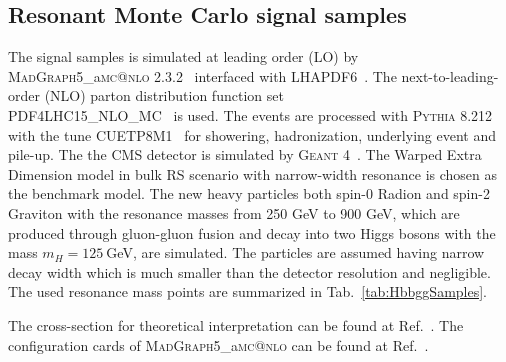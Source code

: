 \subsection{Resonant Monte Carlo signal samples} \label{sec:ResonantMCsamples}

The signal samples is simulated at leading order (LO) by \\{\textsc{MadGraph5}\_a\textsc{mc@nlo}\xspace} 2.3.2~\cite{1405.0301,1407.0281} interfaced with LHAPDF6~\cite{1412.7420}.
The next-to-leading-order (NLO) parton distribution function set \\PDF4LHC15\_NLO\_MC~\cite{1504.06469,1510.03865,1506.07443,1412.3989,1410.8849} is used.
The events are processed with {\textsc{Pythia 8.212}\xspace}~\cite{1410.3012} with the tune CUETP8M1~\cite{1512.00815} for showering, hadronization, underlying event and pile-up.
The the CMS detector is simulated by {\textsc{Geant 4}\xspace}~\cite{Agostinelli2003}.
The Warped Extra Dimension model in bulk RS scenario with narrow-width resonance is chosen as the benchmark model.
The new heavy particles both spin-0 Radion and spin-2 Graviton with the resonance masses from 250 GeV to 900 GeV, which are produced through gluon-gluon fusion and decay into two Higgs bosons with the mass $m_{H}=125~$GeV, are simulated.
The particles are assumed having narrow decay width which is much smaller than the detector resolution and negligible. %
The used resonance mass points are summarized in Tab.~\ref{tab:HbbggSamples}.

The cross-section for theoretical interpretation can be found at Ref.~\cite{WEDXSgithub}.
The configuration cards of {\textsc{MadGraph5}\_a\textsc{mc@nlo}\xspace} can be found at Ref.~\cite{MadCard}.

